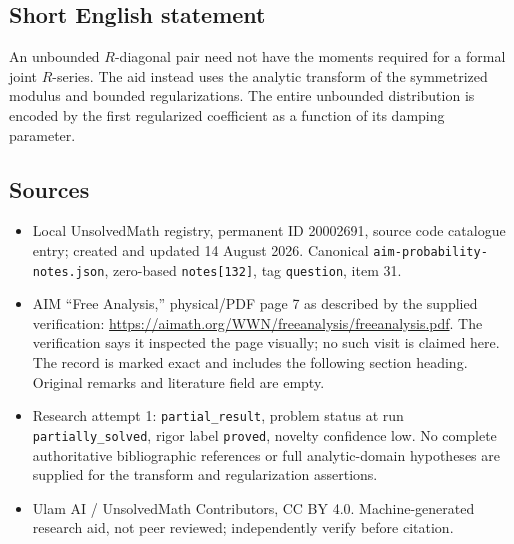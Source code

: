 \documentclass[11pt]{article}
\begin{document}
\subsection{Short English statement}
An unbounded $R$-diagonal pair need not have the moments required for a formal joint $R$-series. The aid instead uses the analytic transform of the symmetrized modulus and bounded regularizations. The entire unbounded distribution is encoded by the first regularized coefficient as a function of its damping parameter.
\subsection{Sources}
\begin{itemize}
\item Local UnsolvedMath registry, permanent ID 20002691, source code catalogue entry; created and updated 14 August 2026. Canonical \texttt{aim-probability-notes.json}, zero-based \texttt{notes[132]}, tag \texttt{question}, item 31.
\item AIM ``Free Analysis,'' physical/PDF page 7 as described by the supplied verification: \url{https://aimath.org/WWN/freeanalysis/freeanalysis.pdf}. The verification says it inspected the page visually; no such visit is claimed here. The record is marked exact and includes the following section heading. Original remarks and literature field are empty.
\item Research attempt 1: \texttt{partial\_result}, problem status at run \texttt{partially\_solved}, rigor label \texttt{proved}, novelty confidence low. No complete authoritative bibliographic references or full analytic-domain hypotheses are supplied for the transform and regularization assertions.
\item Ulam AI / UnsolvedMath Contributors, CC BY 4.0. Machine-generated research aid, not peer reviewed; independently verify before citation.
\end{itemize}
\end{document}
